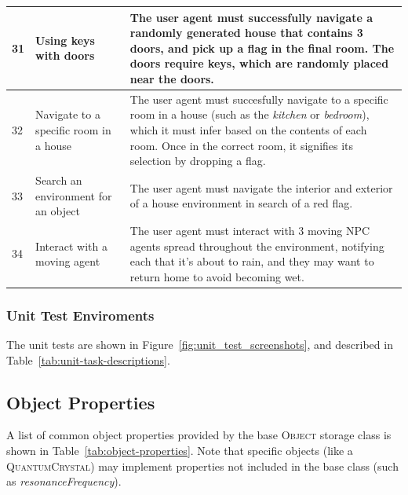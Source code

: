 \documentclass{article}
\begin{document}
\begin{table}[t!]
\begin{tabular}{p{0.3cm}p{3.7cm}p{8cm}}
\midrule
\rowcolor[HTML]{F3F3F3} 
31 & Using keys with doors & The user agent must successfully navigate a randomly generated house that contains 3 doors, and pick up a flag in the final room.  The doors require keys, which are randomly placed near the doors. \\
\midrule
32 & Navigate to a specific room in a house & The user agent must succesfully navigate to a specific room in a house (such as the \textit{kitchen} or \textit{bedroom}), which it must infer based on the contents of each room.  Once in the correct room, it signifies its selection by dropping a flag. \\
\midrule
\rowcolor[HTML]{F3F3F3} 
33 & Search an environment for an object & The user agent must navigate the interior and exterior of a house environment in search of a red flag. \\
\midrule
34 & Interact with a moving agent & The user agent must interact with 3 moving NPC agents spread throughout the environment, notifying each that it's about to rain, and they may want to return home to avoid becoming wet. \\
\bottomrule
\end{tabular}
\end{table}


\subsubsection{Unit Test Enviroments}
The unit tests are shown in Figure~\ref{fig:unit_test_screenshots}, and described in Table~\ref{tab:unit-task-descriptions}.




\subsection{Object Properties}
\label{sec:appendix-object-properties}

A list of common object properties provided by the base \textsc{Object} storage class is shown in Table~\ref{tab:object-properties}.  Note that specific objects (like a \textsc{QuantumCrystal}) may implement properties not included in the base class (such as \textit{resonanceFrequency}).
\end{document}
